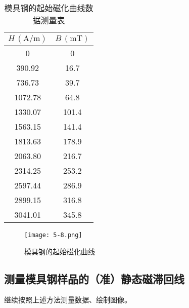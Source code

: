 \documentclass[12pt]{article}
\begin{document}
\begin{table}[htbp]
    \centering
      \begin{tabular}{|c|c|}
      \hline
      $H\,(\mathrm{A/m})$ & $B\,(\mathrm{mT})$ \\
      \hline
      0     & 0 \\
      \hline
      390.92  & 16.7 \\
      \hline
      736.73  & 39.7 \\
      \hline
      1072.78  & 64.8 \\
      \hline
      1330.07  & 101.4 \\
      \hline
      1563.15  & 141.4 \\
      \hline
      1813.63  & 178.9 \\
      \hline
      2063.80  & 216.7 \\
      \hline
      2314.25  & 253.2 \\
      \hline
      2597.44  & 286.9 \\
      \hline
      2899.15  & 316.8 \\
      \hline
      3041.01  & 345.8 \\
      \hline
      \end{tabular}%
    \caption{模具钢的起始磁化曲线数据测量表}
  \end{table}%

\begin{figure}[htbp]
    \centering
    \texttt{[image: 5-8.png]}
    \caption{模具钢的起始磁化曲线}
\end{figure}

\subsection{测量模具钢样品的（准）静态磁滞回线}

继续按照上述方法测量数据、绘制图像。
\end{document}
